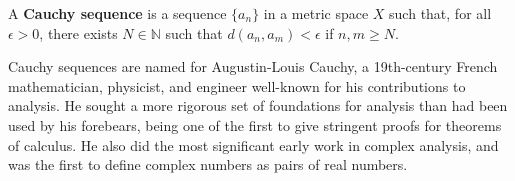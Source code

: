 \documentclass[12pt]{article}
\begin{document}
\begin{defn}
  A \textbf{Cauchy sequence} is a sequence $\{a_n\}$ in a metric space $X$ such that,
  for all $\epsilon > 0$, there exists $N \in \mathbb{N}$ such that $d(a_n,a_m) <
  \epsilon$ if $n,m \geq N$.
\end{defn}

\begin{comm}
  Cauchy sequences are named for Augustin-Louis Cauchy, a 19th-century French
  mathematician, physicist, and engineer well-known for his contributions to
  analysis. He sought a more rigorous set of foundations for analysis than had been
  used by his forebears, being one of the first to give stringent proofs for theorems
  of calculus. He also did the most significant early work in complex analysis, and
  was the first to define complex numbers as pairs of real numbers.
\end{comm}
\end{document}
